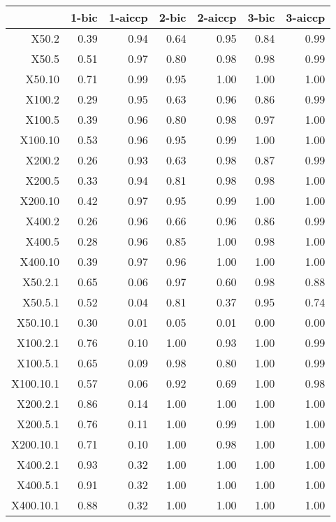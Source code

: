 \begin{table}[ht]
\centering
\begin{tabular}{rrrrrrr}
  \hline
 & 1-bic & 1-aiccp & 2-bic & 2-aiccp & 3-bic & 3-aiccp \\ 
  \hline
X50.2 & 0.39 & 0.94 & 0.64 & 0.95 & 0.84 & 0.99 \\ 
  X50.5 & 0.51 & 0.97 & 0.80 & 0.98 & 0.98 & 0.99 \\ 
  X50.10 & 0.71 & 0.99 & 0.95 & 1.00 & 1.00 & 1.00 \\ 
  X100.2 & 0.29 & 0.95 & 0.63 & 0.96 & 0.86 & 0.99 \\ 
  X100.5 & 0.39 & 0.96 & 0.80 & 0.98 & 0.97 & 1.00 \\ 
  X100.10 & 0.53 & 0.96 & 0.95 & 0.99 & 1.00 & 1.00 \\ 
  X200.2 & 0.26 & 0.93 & 0.63 & 0.98 & 0.87 & 0.99 \\ 
  X200.5 & 0.33 & 0.94 & 0.81 & 0.98 & 0.98 & 1.00 \\ 
  X200.10 & 0.42 & 0.97 & 0.95 & 0.99 & 1.00 & 1.00 \\ 
  X400.2 & 0.26 & 0.96 & 0.66 & 0.96 & 0.86 & 0.99 \\ 
  X400.5 & 0.28 & 0.96 & 0.85 & 1.00 & 0.98 & 1.00 \\ 
  X400.10 & 0.39 & 0.97 & 0.96 & 1.00 & 1.00 & 1.00 \\ 
  X50.2.1 & 0.65 & 0.06 & 0.97 & 0.60 & 0.98 & 0.88 \\ 
  X50.5.1 & 0.52 & 0.04 & 0.81 & 0.37 & 0.95 & 0.74 \\ 
  X50.10.1 & 0.30 & 0.01 & 0.05 & 0.01 & 0.00 & 0.00 \\ 
  X100.2.1 & 0.76 & 0.10 & 1.00 & 0.93 & 1.00 & 0.99 \\ 
  X100.5.1 & 0.65 & 0.09 & 0.98 & 0.80 & 1.00 & 0.99 \\ 
  X100.10.1 & 0.57 & 0.06 & 0.92 & 0.69 & 1.00 & 0.98 \\ 
  X200.2.1 & 0.86 & 0.14 & 1.00 & 1.00 & 1.00 & 1.00 \\ 
  X200.5.1 & 0.76 & 0.11 & 1.00 & 0.99 & 1.00 & 1.00 \\ 
  X200.10.1 & 0.71 & 0.10 & 1.00 & 0.98 & 1.00 & 1.00 \\ 
  X400.2.1 & 0.93 & 0.32 & 1.00 & 1.00 & 1.00 & 1.00 \\ 
  X400.5.1 & 0.91 & 0.32 & 1.00 & 1.00 & 1.00 & 1.00 \\ 
  X400.10.1 & 0.88 & 0.32 & 1.00 & 1.00 & 1.00 & 1.00 \\ 

\end{tabular}
\end{table}
